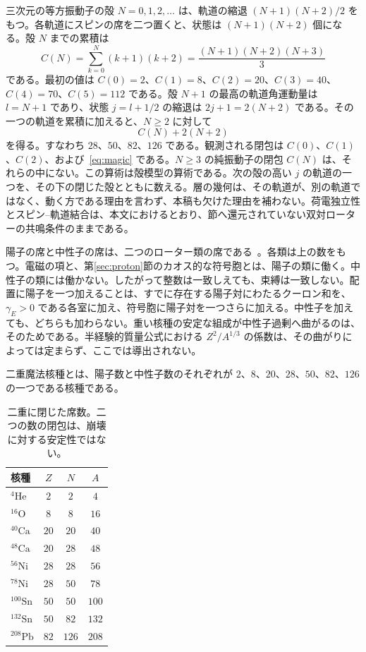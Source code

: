 \documentclass[a4paper]{article}
\begin{document}
三次元の等方振動子の殻 \(N=0,1,2,\dots\) は、軌道の縮退 \((N+1)(N+2)/2\) をもつ。各軌道にスピンの席を二つ置くと、状態は \((N+1)(N+2)\) 個になる。殻 \(N\) までの累積は
\begin{equation}
\label{eq:C}
C(N)
  =\sum_{k=0}^{N}(k+1)(k+2)
  =\frac{(N+1)(N+2)(N+3)}{3}
\end{equation}
である。最初の値は \(C(0)=2\)、\(C(1)=8\)、\(C(2)=20\)、\(C(3)=40\)、\(C(4)=70\)、\(C(5)=112\) である。殻 \(N+1\) の最高の軌道角運動量は \(l=N+1\) であり、状態 \(j=l+1/2\) の縮退は \(2j+1=2(N+2)\) である。その一つの軌道を累積に加えると、\(N\ge 2\) に対して
\begin{equation}
\label{eq:magic}
C(N)+2(N+2)
\end{equation}
を得る。すなわち \(28\)、\(50\)、\(82\)、\(126\) である。観測される閉包は \(C(0)\)、\(C(1)\)、\(C(2)\)、および~\eqref{eq:magic} である。\(N\ge 3\) の純振動子の閉包 \(C(N)\) は、それらの中にない。この算術は殻模型の算術である。次の殻の高い \(j\) の軌道の一つを、その下の閉じた殻とともに数える。層の幾何は、その軌道が、別の軌道ではなく、動く方である理由を言わず、本稿も欠けた理由を補わない。荷電独立性とスピン--軌道結合は、本文におけるとおり、節へ還元されていない双対ローターの共鳴条件のままである。

陽子の席と中性子の席は、二つのローター類の席である~\cite{dst-dio}。各類は上の数をもつ。電磁の項と、第\ref{sec:proton}節のカオス的な符号胞とは、陽子の類に働く。中性子の類には働かない。したがって整数は一致しえても、束縛は一致しない。配置に陽子を一つ加えることは、すでに存在する陽子対にわたるクーロン和を、\(\gamma_E>0\) である各室に加え、符号胞に陽子対を一つさらに加える。中性子を加えても、どちらも加わらない。重い核種の安定な組成が中性子過剰へ曲がるのは、そのためである。半経験的質量公式における \(Z^{2}/A^{1/3}\) の係数は、その曲がりによっては定まらず、ここでは導出されない。

二重魔法核種とは、陽子数と中性子数のそれぞれが \(2\)、\(8\)、\(20\)、\(28\)、\(50\)、\(82\)、\(126\) の一つである核種である。

\begin{table}[htbp]
\centering
\caption{二重に閉じた席数。二つの数の閉包は、崩壊に対する安定性ではない。}
\label{tab:doubly}
\begin{tabular}{lccc}
\hline
核種 & \(Z\) & \(N\) & \(A\) \\
\hline
\({}^{4}\mathrm{He}\) & \(2\) & \(2\) & \(4\) \\
\({}^{16}\mathrm{O}\) & \(8\) & \(8\) & \(16\) \\
\({}^{40}\mathrm{Ca}\) & \(20\) & \(20\) & \(40\) \\
\({}^{48}\mathrm{Ca}\) & \(20\) & \(28\) & \(48\) \\
\({}^{56}\mathrm{Ni}\) & \(28\) & \(28\) & \(56\) \\
\({}^{78}\mathrm{Ni}\) & \(28\) & \(50\) & \(78\) \\
\({}^{100}\mathrm{Sn}\) & \(50\) & \(50\) & \(100\) \\
\({}^{132}\mathrm{Sn}\) & \(50\) & \(82\) & \(132\) \\
\({}^{208}\mathrm{Pb}\) & \(82\) & \(126\) & \(208\) \\
\hline
\end{tabular}
\end{table}
\end{document}
